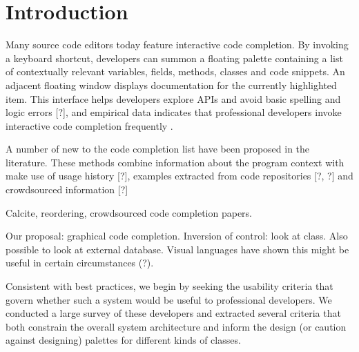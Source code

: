 \documentclass[conference]{IEEEtran}
\begin{document}





%
\IEEEpeerreviewmaketitle



\section{Introduction}
Many source code editors today feature interactive code completion. By invoking a keyboard shortcut, developers can summon a floating palette containing a list of contextually relevant variables, fields, methods, classes and code snippets. An adjacent floating window displays documentation for the currently highlighted item. This interface helps developers explore APIs and avoid basic spelling and logic errors [?], and empirical data indicates that professional developers invoke interactive code completion frequently \cite{murphy_how_2006}. 

A number of new to the code completion list have been proposed in the literature. These methods combine information about the program context with make use of usage history [?], examples extracted from code repositories [?, ?] and crowdsourced information [?] 

Calcite, reordering, crowdsourced code completion papers.

Our proposal: graphical code completion. Inversion of control: look at class. Also possible to look at external database. Visual languages have shown this might be useful in certain circumstances (?).

Consistent with best practices, we begin by seeking the usability criteria that govern whether such a system would be useful to professional developers. We conducted a large survey of these developers and extracted several criteria that both constrain the overall system architecture and inform the design (or caution against designing) palettes for different kinds of classes.
\end{document}
